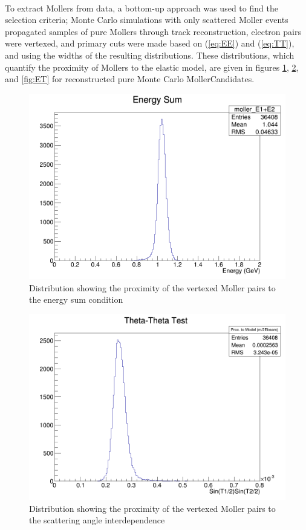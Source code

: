 \documentclass{article}
\begin{document}
	\paragraph{}
	To extract Mollers from data, a bottom-up approach was used to find the selection criteria; Monte Carlo simulations with only scattered Moller events propagated samples of pure Mollers through track reconstruction, electron pairs were vertexed, and primary cuts were made based on (\ref{eq:EE}) and (\ref{eq:TT}), and using the widths of the resulting distributions. These distributions, which quantify the proximity of Mollers to the elastic model, are given in figures \ref{fig:EE}, \ref{fig:TT}, and \ref{fig:ET} for reconstructed pure Monte Carlo MollerCandidates.

	\begin{figure}[H]
  	\includegraphics[width=\linewidth]{PostCollabMeet/Pass3PureMoller/RAW_moller_ESum.png}
  	\caption{Distribution showing the proximity of the vertexed Moller pairs to the energy sum condition}
  	\label{fig:EE}
	\end{figure}

	\begin{figure}[H]
  	\includegraphics[width=\linewidth]{PostCollabMeet/Pass3PureMoller/RAW_SinSinTest.png}
  	\caption{Distribution showing the proximity of the vertexed Moller pairs to the scattering angle interdependence}
  	\label{fig:TT}
	\end{figure}
\end{document}
